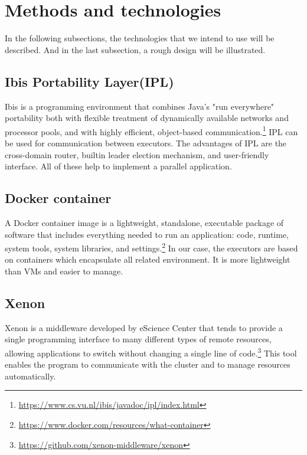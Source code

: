 \documentclass[sigchi]{acmart}
\begin{document}
\section{Methods and technologies}
In the following subsections, the technologies that we intend to use will be described. And in the last subsection, a rough design will be illustrated. 
\subsection{ Ibis Portability Layer(IPL) }
Ibis\cite{van2002ibis} is a programming environment that combines Java's "run everywhere" portability both with flexible treatment of dynamically available networks and processor pools, and with highly efficient, object-based communication.\footnote{\url{https://www.cs.vu.nl/ibis/javadoc/ipl/index.html}}
IPL can be used for communication between executors. The advantages of IPL are the cross-domain router, builtin leader election mechanism, and user-friendly interface. All of these help to implement a parallel application.

\subsection{Docker container}
A Docker container image is a lightweight, standalone, executable package of software that includes everything needed to run an application: code, runtime, system tools, system libraries, and settings.\footnote{\url{https://www.docker.com/resources/what-container}}
In our case, the executors are based on containers which encapsulate all related environment. It is more lightweight than VMs and easier to manage.

\subsection{Xenon}
Xenon is a middleware developed by eScience Center that tends to provide a single programming interface to many different types of remote resources, allowing applications to switch without changing a single line of code.\footnote{\url{https://github.com/xenon-middleware/xenon}}
This tool enables the program to communicate with the cluster and to manage resources automatically.
\end{document}
